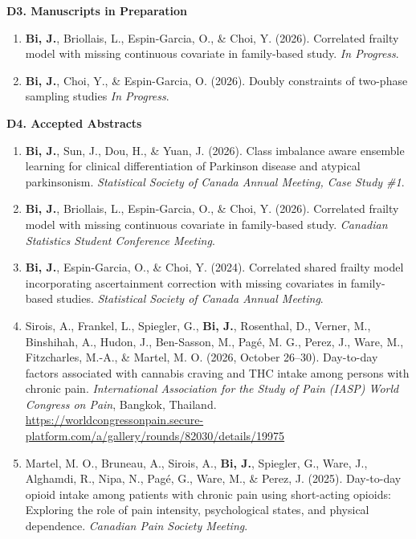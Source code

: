 \documentclass[10pt]{article}
\newcommand{\cvsubsection}[1]{%
  \Needspace{4\baselineskip}%
  \vspace{0.3em}%
  {\bfseries #1}\par
}
\begin{document}
\cvsubsection{D3. Manuscripts in Preparation}
\begin{enumerate}[leftmargin=1.6em]
\item \textbf{Bi, J.}, Briollais, L., Espin-Garcia, O., \& Choi, Y. (2026). Correlated frailty model with missing continuous covariate in family-based study. \emph{In Progress}.

\item \textbf{Bi, J.}, Choi, Y., \& Espin-Garcia, O. (2026). Doubly constraints of two-phase sampling studies \emph{In Progress}.
\end{enumerate}

\cvsubsection{D4. Accepted Abstracts}
\begin{enumerate}[leftmargin=1.6em]
\item \textbf{Bi, J.}, Sun, J., Dou, H., \& Yuan, J. (2026). Class imbalance aware ensemble learning for clinical differentiation of Parkinson disease and atypical parkinsonism. \emph{Statistical Society of Canada Annual Meeting, Case Study \#1}.

\item \textbf{Bi, J.}, Briollais, L., Espin-Garcia, O., \& Choi, Y. (2026). Correlated frailty model with missing continuous covariate in family-based study. \emph{Canadian Statistics Student Conference Meeting}.

\item \textbf{Bi, J.}, Espin-Garcia, O., \& Choi, Y. (2024). Correlated shared frailty model incorporating ascertainment correction with missing covariates in family-based studies. \emph{Statistical Society of Canada Annual Meeting}.

\item Sirois, A., Frankel, L., Spiegler, G., \textbf{Bi, J.}, Rosenthal, D., Verner, M., Binshihah, A., Hudon, J., Ben-Sasson, M., Pag\'{e}, M. G., Perez, J., Ware, M., Fitzcharles, M.-A., \& Martel, M. O. (2026, October 26--30). Day-to-day factors associated with cannabis craving and THC intake among persons with chronic pain. \emph{International Association for the Study of Pain (IASP) World Congress on Pain}, Bangkok, Thailand.\\
\url{https://worldcongressonpain.secure-platform.com/a/gallery/rounds/82030/details/19975}

\item Martel, M. O., Bruneau, A., Sirois, A., \textbf{Bi, J.}, Spiegler, G., Ware, J., Alghamdi, R., Nipa, N., Pag\'{e}, G., Ware, M., \& Perez, J. (2025). Day-to-day opioid intake among patients with chronic pain using short-acting opioids: Exploring the role of pain intensity, psychological states, and physical dependence. \emph{Canadian Pain Society Meeting}.


\end{enumerate}
\end{document}
